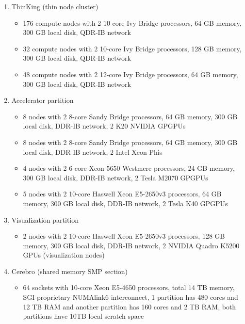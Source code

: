 \fi
\ifleuven
  \begin{enumerate}
     \item ThinKing (thin node cluster)
      \begin{itemize}
       \item  176 compute nodes with 2 10-core Ivy Bridge processors, 64 GB memory,
              300 GB local disk, QDR-IB network
       \item  32 compute nodes with 2 10-core Ivy Bridge processors, 128 GB memory,
              300 GB local disk, QDR-IB network
       \item  48 compute nodes with 2 12-core Ivy Bridge processors, 64 GB memory,
              300 GB local disk, QDR-IB network
      \end{itemize}
    \item Accelerator partition
      \begin{itemize}
       \item  8 nodes with 2 8-core Sandy Bridge processors, 64 GB memory,
              300 GB local disk, DDR-IB network, 2 K20 NVIDIA GPGPUs
       \item  8 nodes with 2 8-core Sandy Bridge processors, 64 GB memory,
              300 GB local disk, DDR-IB network, 2 Intel Xeon Phis
       \item  4 nodes with 2 6-core Xeon 5650 Westmere processors, 24 GB memory,
              300 GB local disk, DDR-IB network, 2 Tesla M2070 GPGPUs
       \item  5 nodes with 2 10-core Haswell Xeon E5-2650v3 processors, 64 GB memory,
              300 GB local disk, DDR-IB network, 2 Tesla K40 GPGPUs
      \end{itemize}
    \item Visualization partition
      \begin{itemize}
       \item  2 nodes with 2 10-core Haswell Xeon E5-2650v3 processors, 128 GB memory,
              300 GB local disk, DDR-IB network, 2 NVIDIA Quadro K5200 GPUs (visualization nodes)
      \end{itemize}
    \item Cerebro (shared memory SMP section)
      \begin{itemize}
        \item  64 sockets with 10-core Xeon E5-4650 processors, total 14 TB memory,
               SGI-proprietary NUMAlink6 interconnect,
               1 partition has 480 cores and 12 TB RAM and another partition has 160 cores and 2 TB RAM,
               both partitions have 10TB local scratch space
      \end{itemize}
  \end{enumerate}
